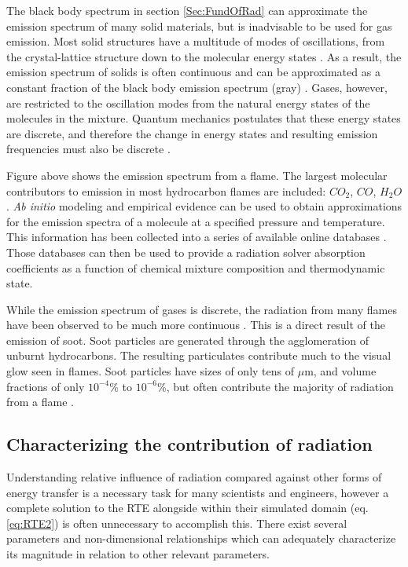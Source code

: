 The black body spectrum in section \ref{Sec:FundOfRad} can approximate the emission spectrum of many solid materials, but is inadvisable to be used for gas emission. 
Most solid structures have a multitude of modes of oscillations, from the crystal-lattice structure down to the molecular energy states \cite{Viskanta1975HeatSolids}. As a result, the emission spectrum of solids is often continuous and can be approximated as a constant fraction of the black body emission spectrum (gray) \cite{Howell2010ThermalTransfer}. 
Gases, however, are restricted to the oscillation modes from the natural energy states of the molecules in the mixture. Quantum mechanics postulates that these energy states are discrete, and therefore the change in energy states and resulting emission frequencies must also be discrete \cite{Hanson2016SpectroscopyGases}.

Figure above shows the emission spectrum from a flame. The largest molecular contributors to emission in most hydrocarbon flames are included: $CO_2$, $CO$, $H_2O$.
\textit{Ab initio} modeling and empirical evidence can be used to obtain approximations for the emission spectra of a molecule at a specified pressure and temperature. This information has been collected into a series of available online databases \cite{Rothman2010HITEMPDatabase}. 
Those databases can then be used to provide a radiation solver absorption coefficients as a function of chemical mixture composition and thermodynamic state.

While the emission spectrum of gases is discrete, the radiation from many flames have been observed to be much more continuous \cite{Modest2013RadiativeTransfer}. This is a direct result of the emission of soot.
Soot particles are generated through the agglomeration of unburnt hydrocarbons. The resulting particulates contribute much to the visual glow seen in flames. 
Soot particles have sizes of only tens of $\mu{}$m, and volume fractions of only $10^{-4}$\% to $10^{-6}$\%, but often contribute the majority of radiation from a flame \cite{Modest2013RadiativeTransfer}.

\subsection{Characterizing the contribution of radiation}
Understanding relative influence of radiation compared against other forms of energy transfer is a necessary task for many scientists and engineers, however a complete solution to the RTE alongside within their simulated domain (eq. \ref{eq:RTE2}) is often unnecessary to accomplish this. 
There exist several parameters and non-dimensional relationships which can adequately characterize its magnitude in relation to other relevant parameters.

